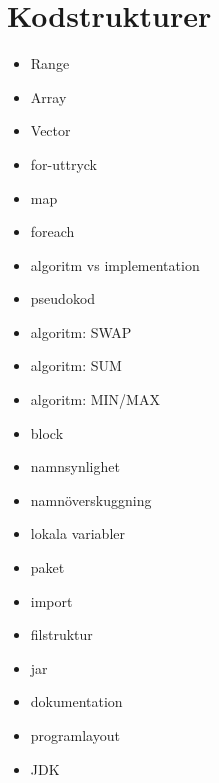 \chapter{Kodstrukturer}\label{chapter:W02}
\begin{itemize}[nosep]
\item Range
\item Array
\item Vector
\item for-uttryck
\item map
\item foreach
\item algoritm vs implementation
\item pseudokod
\item algoritm: SWAP
\item algoritm: SUM
\item algoritm: MIN/MAX
\item block
\item namnsynlighet
\item namnöverskuggning
\item lokala variabler
\item paket
\item import
\item filstruktur
\item jar
\item dokumentation
\item programlayout
\item JDK
\end{itemize}